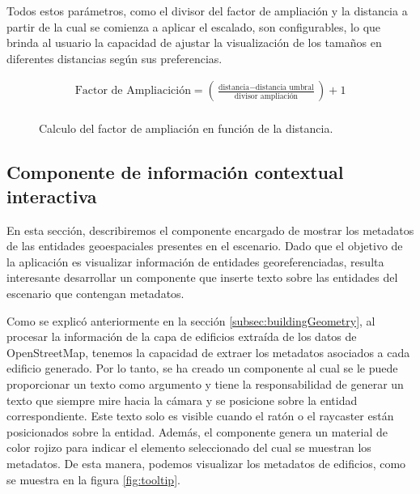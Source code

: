 \documentclass[a4paper, 11pt]{book}
\begin{document}
Todos estos parámetros, como el divisor del factor de ampliación y la distancia a partir de la cual se comienza a aplicar el escalado, son configurables, lo que brinda al usuario la capacidad de ajustar la visualización de los tamaños en diferentes distancias según sus preferencias.

\begin{figure}[h]
\begin{align*}
\text{{Factor de Ampliacición}} = \left(\frac{{\text{{distancia}} - \text{{distancia umbral}}}}{{\text{{divisor ampliación}}}}\right) + 1\\
\end{align*}
\caption{Calculo del factor de ampliación en función de la distancia.}
  \label{formula:ampliación}
\end{figure}

\subsection{Componente de información contextual interactiva}
\label{subsec:tooltip}
En esta sección, describiremos el componente encargado de mostrar los metadatos de las entidades geoespaciales presentes en el escenario. Dado que el objetivo de la aplicación es visualizar información de entidades georeferenciadas, resulta interesante desarrollar un componente que inserte texto sobre las entidades del escenario que contengan metadatos.

Como se explicó anteriormente en la sección \ref{subsec:buildingGeometry}, al procesar la información de la capa de edificios extraída de los datos de OpenStreetMap, tenemos la capacidad de extraer los metadatos asociados a cada edificio generado. Por lo tanto, se ha creado un componente al cual se le puede proporcionar un texto como argumento y tiene la responsabilidad de generar un texto que siempre mire hacia la cámara y se posicione sobre la entidad correspondiente. Este texto solo es visible cuando el ratón o el raycaster están posicionados sobre la entidad. Además, el componente genera un material de color rojizo para indicar el elemento seleccionado del cual se muestran los metadatos. De esta manera, podemos visualizar los metadatos de edificios, como se muestra en la figura \ref{fig:tooltip}.
\end{document}
